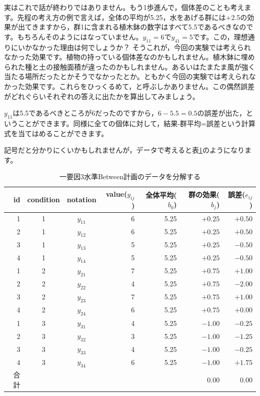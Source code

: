 \documentclass{ltjbook}
\begin{document}
実はこれで話が終わりではありません。もう1歩進んで，個体差のことも考えます。先程の考え方の例で言えば，全体の平均が5.25，水をあげる群には+2.5の効果が出てきますから，群1に含まれる植木鉢の数字はすべて5.5であるべきなのです。もちろんそのようにはなっていません。$y_{11} = 6$で$y_{41}=5$です。この，理想通りにいかなかった理由は何でしょうか？ そうこれが，今回の実験では考えられなかった効果です。植物の持っている個体差なのかもしれません。植木鉢に埋められた種と土の接触面積が違ったのかもしれません。あるいはたまたま風が強く当たる場所だったとかそうでなかったとか。ともかく今回の実験では考えられなかった効果です。これらをひっくるめて，と呼ぶしかありません。この偶然誤差がどれぐらいそれぞれの答えに出たかを算出してみましょう。

$y_{11}$は5.5であるべきところが6だったのですから，$6-5.5=0.5$の誤差が出た，ということができます。同様に全ての個体に対して，結果-群平均=誤差という計算式を当てはめることができます。

記号だと分かりにくいかもしれませんが，データで考えると表\ref{table::21_03}のようになります。
\begin{table}[ht]
    \centering
    \caption{一要因3水準Between計画のデータを分解する}
    \begin{tabular}{rccrrrr}
      \hline
    id & condition & notation & value($y_{ij}$) & 全体平均($b_0$) & 群の効果($b_j$) & 誤差($e_{ij}$)\\ 
      \hline
      1 & 1 & $y_{11}$ & 6 & 5.25 & $+0.25$ & $+0.50$\\ 
      2 & 1 & $y_{12}$ & 6 & 5.25 & $+0.25$ & $+0.50$\\ 
      3 & 1 & $y_{13}$ & 5 & 5.25 & $+0.25$ & $-0.50$\\ 
      4 & 1 & $y_{14}$ & 5 & 5.25 & $+0.25$ & $-0.50$\\ 
      1 & 2 & $y_{21}$ & 7 & 5.25 & $+0.75$ & $+1.00$\\ 
      2 & 2 & $y_{22}$ & 4 & 5.25 & $+0.75$ & $-2.00$ \\ 
      3 & 2 & $y_{23}$ & 7 & 5.25 & $+0.75$ & $+1.00$\\ 
      4 & 2 & $y_{24}$ & 6 & 5.25 & $+0.75$ & $+0.00$\\ 
      1 & 3 & $y_{31}$ & 4 & 5.25 & $-1.00$ & $-0.25$\\ 
      2 & 3 & $y_{32}$ & 3 & 5.25 & $-1.00$ & $-1.25$\\ 
      3 & 3 & $y_{33}$ & 4 & 5.25 & $-1.00$ & $-0.25$\\ 
      4 & 3 & $y_{34}$ & 6 & 5.25 & $-1.00$ & $+1.75$\\ 
       \hline\hline
       合計 &&&&& 0.00 & 0.00\\\hline
    \end{tabular}
    \label{table::21_03}
    \end{table}
\end{document}
